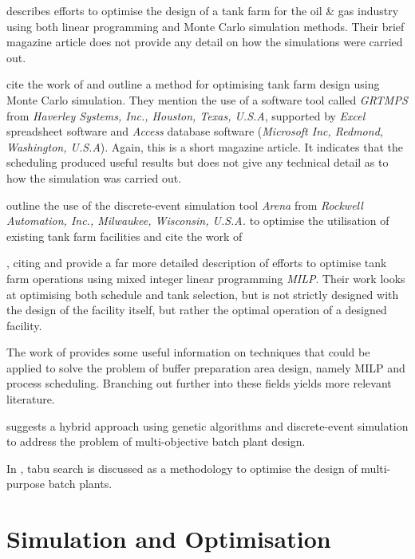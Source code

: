\citet{Al-Otaibi:2004} describes efforts to optimise the design of a tank farm
for the oil \& gas industry using both linear programming and Monte Carlo
simulation methods.  Their brief magazine article does not provide any detail on
how the simulations were carried out.

\citet{Stewart:2005} cite the work of \citet{Al-Otaibi:2004} and outline a
method for optimising tank farm design using Monte Carlo simulation.  They
mention the use of a software tool called \emph{GRTMPS} from 
\emph{Haverley Systems, Inc., Houston, Texas, U.S.A}, supported by \emph{Excel}
spreadsheet software and \emph{Access} database software
(\emph{Microsoft Inc, Redmond, Washington, U.S.A}).
Again, this is a short magazine article.  It indicates that the scheduling 
produced useful results but does not give any technical detail as to how the
simulation was carried out.

\citet{Sharda:2009} outline the use of the discrete-event simulation tool
\emph{Arena\textsuperscript{\textregistered}} from
\emph{Rockwell Automation, Inc., Milwaukee, Wisconsin, U.S.A.} to optimise the 
utilisation of existing tank farm facilities and cite the work of
\citet{Sharda:2009}

\citet{Terrazas-Moreno:2012}, citing \citet{Stewart:2005} and 
\citet{Sharda:2009} provide a far more detailed description of efforts to
optimise tank farm operations using mixed integer linear programming 
\emph{MILP}.  Their work looks at optimising both schedule and tank selection, 
but is not strictly designed with the design of the facility itself, but rather
the optimal operation of a designed facility.

The work of \citet{Terrazas-Moreno:2012} provides some useful information on
techniques that could be applied to solve the problem of buffer preparation
area design, namely MILP and process scheduling.  Branching out further into
these fields yields more relevant literature.

\citet{Dedieu:2003} suggests a hybrid approach using genetic
algorithms and discrete-event simulation to address the problem of 
multi-objective batch plant design.

In \citet{Cavin:2004, Cavin:2005}, tabu search is discussed as a methodology to
optimise the design of multi-purpose batch plants.

\section{Simulation and Optimisation}\label{SS.simopt}

